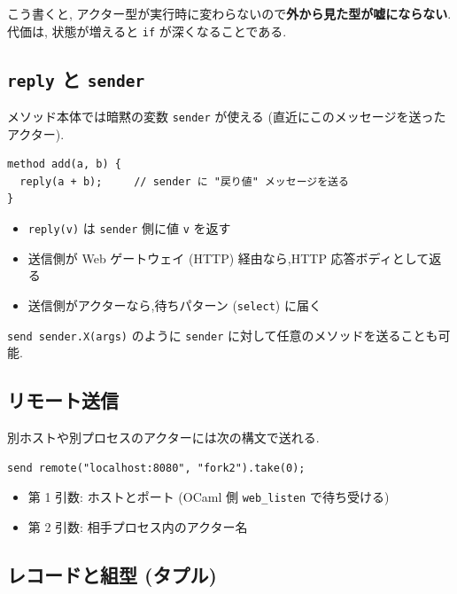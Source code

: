 \documentclass[11pt,a4paper]{article}
\begin{document}
こう書くと, アクター型が実行時に変わらないので\textbf{外から見た型が嘘にならない}.
代価は, 状態が増えると \texttt{if} が深くなることである.

\subsection{\texttt{reply} と \texttt{sender}}
\label{sec:replysender}

メソッド本体では暗黙の変数 \texttt{sender} が使える (直近にこのメッセージを送ったアクター).

\begin{lstlisting}
method add(a, b) {
  reply(a + b);     // sender に "戻り値" メッセージを送る
}
\end{lstlisting}

\begin{itemize}
  \item \texttt{reply(v)} は \texttt{sender} 側に値 \texttt{v} を返す
  \item 送信側が Web ゲートウェイ (HTTP) 経由なら,HTTP 応答ボディとして返る
  \item 送信側がアクターなら,待ちパターン (\texttt{select}) に届く
\end{itemize}

\texttt{send sender.X(args)} のように \texttt{sender} に対して任意のメソッドを送ることも可能.

\subsection{リモート送信}

別ホストや別プロセスのアクターには次の構文で送れる.

\begin{lstlisting}
send remote("localhost:8080", "fork2").take(0);
\end{lstlisting}

\begin{itemize}
  \item 第 1 引数: ホストとポート (OCaml 側 \texttt{web\_listen} で待ち受ける)
  \item 第 2 引数: 相手プロセス内のアクター名
\end{itemize}

\subsection{レコードと組型 (タプル)}

\noindent{}
\end{document}
